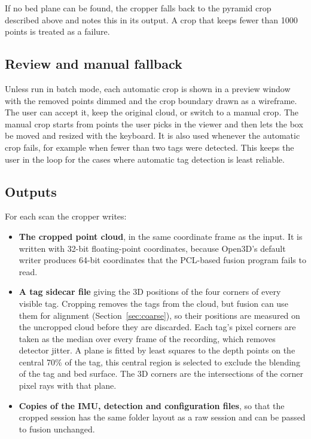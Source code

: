 If no bed plane can be found, the cropper falls back to the pyramid crop described above and notes this in its output. A crop that keeps fewer than 1000 points is treated as a failure.

\subsection{Review and manual fallback}

Unless run in batch mode, each automatic crop is shown in a preview window with the removed points dimmed and the crop boundary drawn as a wireframe. The user can accept it, keep the original cloud, or switch to a manual crop. The manual crop starts from points the user picks in the viewer and then lets the box be moved and resized with the keyboard. It is also used whenever the automatic crop fails, for example when fewer than two tags were detected. This keeps the user in the loop for the cases where automatic tag detection is least reliable.

\subsection{Outputs}

For each scan the cropper writes:

\begin{itemize}
	\item \textbf{The cropped point cloud}, in the same coordinate frame as the input. It is written with 32-bit floating-point coordinates, because Open3D's default writer produces 64-bit coordinates that the PCL-based fusion program fails to read.
	\item \textbf{A tag sidecar file} giving the 3D positions of the four corners of every visible tag. Cropping removes the tags from the cloud, but fusion can use them for alignment (Section~\ref{sec:coarse}), so their positions are measured on the uncropped cloud before they are discarded. Each tag's pixel corners are taken as the median over every frame of the recording, which removes detector jitter. A plane is fitted by least squares to the depth points on the central 70\% of the tag, this central region is selected to exclude the blending of the tag and bed surface. The 3D corners are the intersections of the corner pixel rays with that plane. 
	\item \textbf{Copies of the IMU, detection and configuration files}, so that the cropped session has the same folder layout as a raw session and can be passed to fusion unchanged.
\end{itemize}


